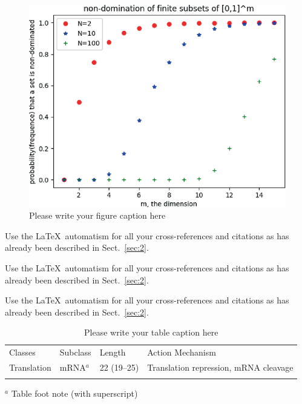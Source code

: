 \begin{figure}[t]
	\sidecaption[t]
	\includegraphics{figure}
	\caption{Please write your figure caption here}
	\label{fig:2}       %
\end{figure}

 Use the \LaTeX\ automatism for all your cross-references and citations as has already been described in Sect.~\ref{sec:2}.

 Use the \LaTeX\ automatism for all your cross-refer\-ences and citations as has already been described in Sect.~\ref{sec:2}.

 Use the \LaTeX\ automatism for all your cross-refer\-ences and citations as has already been described in Sect.~\ref{sec:2}.
%
%
\begin{table}[!t]
	\caption{Please write your table caption here}
	\label{tab:1}       %
	\begin{tabular}{p{2cm}p{2.4cm}p{2cm}p{4.9cm}}
		\hline\noalign{\smallskip}
		Classes     & Subclass & Length      & Action Mechanism                      \\
		\noalign{\smallskip}\svhline\noalign{\smallskip}
		Translation & mRNA$^a$ & 22 (19--25) & Translation repression, mRNA cleavage \\
		\noalign{\smallskip}\hline\noalign{\smallskip}
	\end{tabular}
	$^a$ Table foot note (with superscript)
\end{table}
%
